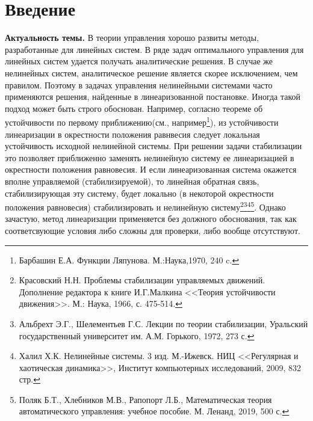 \documentclass[../main.tex]{subfiles}
\begin{document}
    \section{Введение}
\textbf{Актуальность темы.} В теории управления хорошо развиты методы, разработанные для линейных систем. В ряде задач оптимального управления для линейных систем удается получать аналитические решения. В случае же нелинейных систем, аналитическое решение является скорее исключением, чем правилом. Поэтому в задачах управления нелинейными системами часто применяются решения, найденные в линеаризованной постановке. Иногда такой подход может быть строго обоснован. Например, согласно теореме об устойчивости по первому приближению(см., например\footnote{Барбашин Е.А. Функции Ляпунова. М.:Наука,1970, 240 c.}), из устойчивости линеаризации в окрестности положения равнвесия следует локальная устойчивость исходной нелинейной системы. При решении задачи стабилизации это позволяет приближенно заменять нелинейную систему ее линеаризацией в окрестности положения равновесия. И если линеаризованная система окажется вполне управляемой (стабилизируемой), то линейная обратная связь, стабилизирующая эту систему, будет локально (в некоторой окрестности положения равновесия) стабилизировать и нелинейную систему\footnote{Красовский Н.Н. Проблемы стабилизации управляемых движений. Дополнение редактора к книге И.Г.Малкина <<Теория устойчивости  движения>>. М.: Наука, 1966, с. 475-514.}\footnote{Альбрехт Э.Г., Шелементьев Г.С. Лекции по теории стабилизации, Уральский государственный университет им. А.М. Горького, 1972, 273 с.}\footnote{Халил Х.К. Нелинейные системы. 3 изд. М.-Ижевск. НИЦ <<Регулярная и хаотическая динамика>>, Институт компьютерных исследований, 2009, 832 стр.}\footnote{Поляк Б.Т., Хлебников М.В., Рапопорт Л.Б., Математическая теория автоматического управления: учебное пособие. М. Ленанд, 2019, 500 с.}.  Однако зачастую, метод линеаризации применяется без должного обоснования, так как соответсвующие условия либо сложны для проверки, либо вообще отсутствуют.
\end{document}
